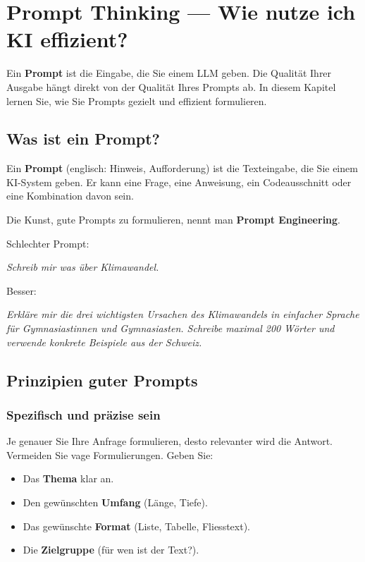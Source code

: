 \chapter{Prompt Thinking --- Wie nutze ich KI effizient?}\label{ch:K04_Prompt_Thinking}

\begin{myremark}
Ein \textbf{Prompt} ist die Eingabe, die Sie einem LLM geben. Die Qualität Ihrer
Ausgabe hängt direkt von der Qualität Ihres Prompts ab. In diesem Kapitel lernen Sie,
wie Sie Prompts gezielt und effizient formulieren.
\end{myremark}

\section{Was ist ein Prompt?}

\begin{mydefinition}
Ein \textbf{Prompt} (englisch: Hinweis, Aufforderung) ist die Texteingabe, die Sie
einem KI-System geben. Er kann eine Frage, eine Anweisung, ein Codeausschnitt oder
eine Kombination davon sein.

Die Kunst, gute Prompts zu formulieren, nennt man \textbf{Prompt Engineering}.
\end{mydefinition}

\begin{myexample}
Schlechter Prompt:
\begin{center}
    \textit{Schreib mir was über Klimawandel.}
\end{center}

Besser:
\begin{center}
    \textit{Erkläre mir die drei wichtigsten Ursachen des Klimawandels in
    einfacher Sprache für Gymnasiastinnen und Gymnasiasten.
    Schreibe maximal 200 Wörter und verwende konkrete Beispiele aus der Schweiz.}
\end{center}
\end{myexample}

\section{Prinzipien guter Prompts}

\subsection{Spezifisch und präzise sein}

\begin{mysummary}
Je genauer Sie Ihre Anfrage formulieren, desto relevanter wird die Antwort.
Vermeiden Sie vage Formulierungen. Geben Sie:
\begin{itemize}
    \item Das \textbf{Thema} klar an.
    \item Den gewünschten \textbf{Umfang} (Länge, Tiefe).
    \item Das gewünschte \textbf{Format} (Liste, Tabelle, Fliesstext).
    \item Die \textbf{Zielgruppe} (für wen ist der Text?).
\end{itemize}
\end{mysummary}

